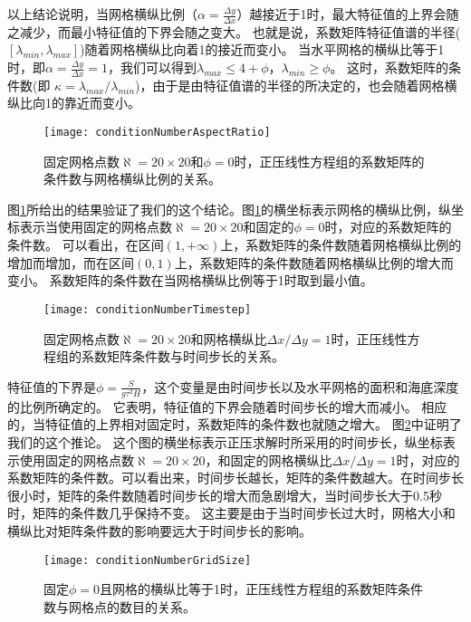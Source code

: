 以上结论说明，当网格横纵比例（$\alpha  = \frac{ \Delta y}{ \Delta x }$）越接近于1时，最大特征值的上界会随之减少，而最小特征值的下界会随之变大。
也就是说，系数矩阵特征值谱的半径($[\lambda_{min}, \lambda_{max}]$)随着网格横纵比向着1的接近而变小。 
当水平网格的横纵比等于1时，即$ \alpha = \frac{ \Delta y}{ \Delta x} = 1$，我们可以得到$\lambda_{max} \le  4 +\phi$，$\lambda_{min} \ge   \phi$。
这时，系数矩阵的条件数(即 $\kappa=  \lambda_{max}/\lambda_{min}$)，由于是由特征值谱的半径的所决定的，也会随着网格横纵比向1的靠近而变小。 

\begin{figure}[ht]
\centering
\texttt{[image: conditionNumberAspectRatio]}
\caption[] {固定网格点数$\aleph = 20\times 20$和$\phi = 0$时，正压线性方程组的系数矩阵的条件数与网格横纵比例的关系。 \label{fig:conditionNumberRatio}}
\end{figure}
图\ref{fig:conditionNumberRatio}所给出的结果验证了我们的这个结论。图\ref{fig:conditionNumberRatio}的横坐标表示网格的横纵比例，纵坐标表示当使用固定的网格点数$\aleph = 20\times 20$和固定的$\phi = 0$时，对应的系数矩阵的条件数。 
可以看出，在区间$(1, +\infty)$上，系数矩阵的条件数随着网格横纵比例的增加而增加，而在区间$(0,1)$上，系数矩阵的条件数随着网格横纵比例的增大而变小。
系数矩阵的条件数在当网格横纵比例等于1时取到最小值。
 
\begin{figure}[ht]
\centering
\texttt{[image: conditionNumberTimestep]}
\caption[] {固定网格点数$\aleph= 20\times 20$和网格横纵比$\Delta x /{\Delta y} = 1$时，正压线性方程组的系数矩阵条件数与时间步长的关系。 \label{fig:conditionNumberDt}}
\end{figure}
特征值的下界是$\phi=\frac{S }{g \tau^2 H}$，这个变量是由时间步长以及水平网格的面积和海底深度的比例所确定的。
它表明，特征值的下界会随着时间步长的增大而减小。 
相应的，当特征值的上界相对固定时，系数矩阵的条件数也就随之增大。
图\ref{fig:conditionNumberDt}中证明了我们的这个推论。
这个图的横坐标表示正压求解时所采用的时间步长，纵坐标表示使用固定的网格点数$\aleph= 20\times 20$，和固定的网格横纵比$\Delta x /{\Delta y} = 1$时，对应的系数矩阵的条件数。可以看出来，时间步长越长，矩阵的条件数越大。在时间步长很小时，矩阵的条件数随着时间步长的增大而急剧增大，当时间步长大于0.5秒时，矩阵的条件数几乎保持不变。
这主要是由于当时间步长过大时，网格大小和横纵比对矩阵条件数的影响要远大于时间步长的影响。

\begin{figure}[ht]
\centering
\texttt{[image: conditionNumberGridSize]}
\caption[] {固定$\phi=0$且网格的横纵比等于1时，正压线性方程组的系数矩阵条件数与网格点的数目的关系。 \label{fig:conditionNumbGrid}}
\end{figure}
 
